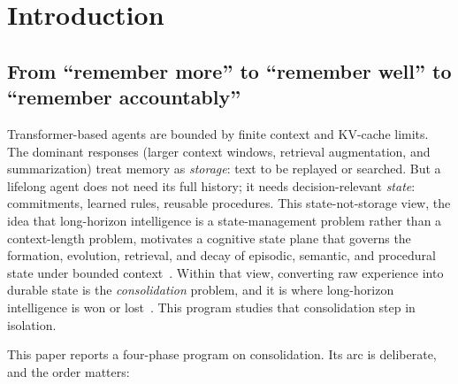 \documentclass[11pt]{article}
\begin{document}
\begin{abstract}
from fifteen of twenty rows to zero while the metric stays discriminant from retention
and non-circular). With the metric now resolving a twelve-policy panel, a two-benchmark
study with $2{,}532$ real answer cells finds that the quality score does \emph{not}
predict real transfer accuracy: pooled Spearman $\rho = -0.24$ ($n{=}12$, $95\%$ CI
spanning zero), with all three axes failing individually. We therefore position the
quality score as a resolution-valid, oracle-normalized measure of the consolidation
\emph{decision}, not as a predictor of downstream answer quality. Across all four phases,
every win is reported alongside its limits; an adversarial self-critique pass cleared the
final claim set with zero surviving overclaims. The throughline is \emph{epistemics}:
each phase's durable contribution was a way to \emph{know}, to measure, to audit, or
to tell truth from artifact, rather than a solved task.
\end{abstract}

\section{Introduction}

\subsection{From ``remember more'' to ``remember well'' to ``remember accountably''}

Transformer-based agents are bounded by finite context and KV-cache limits. The
dominant responses (larger context windows, retrieval augmentation, and
summarization) treat memory as \emph{storage}: text to be replayed or searched.
But a lifelong agent does not need its full history; it needs decision-relevant
\emph{state}: commitments, learned rules, reusable procedures. This
state-not-storage view, the idea that long-horizon intelligence is a state-management
problem rather than a context-length problem, motivates a cognitive state plane that governs
the formation, evolution, retrieval, and decay of episodic, semantic, and procedural
state under bounded context~\cite{stateplane}. Within that view, converting raw
experience into durable state is the \emph{consolidation} problem, and it is where
long-horizon intelligence is won or lost~\cite{stateplane,episodicgap,compspectrum}.
This program studies that consolidation step in isolation.

This paper reports a four-phase program on consolidation. Its arc is deliberate, and
the order matters:
\end{document}
